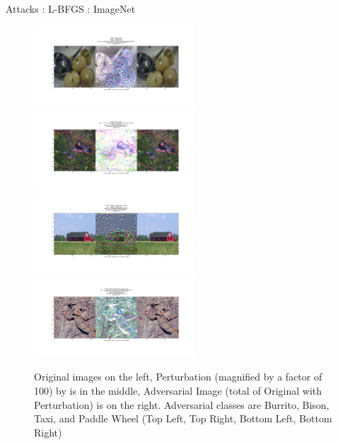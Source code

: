 \begin{frame}{Attacks : L-BFGS : ImageNet}
 \begin{figure}[H]
\label{lbfgsis}
\includegraphics[trim=200 185 100 200, clip, width=6cm]{2019-04-10-adverse/imnet_examples/vgg16-ILSVRC2012_val_00039098-O722-A965-attack_summary.png}\includegraphics[trim=200 185 100 200, clip, width=6cm]{2019-04-10-adverse/imnet_examples/vgg16-ILSVRC2012_val_00027142-O52-A347-attack_summary.png}
\includegraphics[trim=200 185 100 200, clip, width=6cm]{2019-04-10-adverse/imnet_examples/vgg16-ILSVRC2012_val_00029901-O425-A468-attack_summary.png}\includegraphics[trim=200 185 100 200, clip, width=6cm]{2019-04-10-adverse/imnet_examples/ILSVRC2012_val_00001375-Otensor([42])-A694-attack_summary.png}
\caption{Original images on the left, Perturbation (magnified by a factor of 100) by is in the middle, Adversarial Image (total of Original with Perturbation) is on the right. Adversarial classes are Burrito, Bison, Taxi, and Paddle Wheel (Top Left, Top Right, Bottom Left, Bottom Right)}
\end{figure}   
\end{frame}

